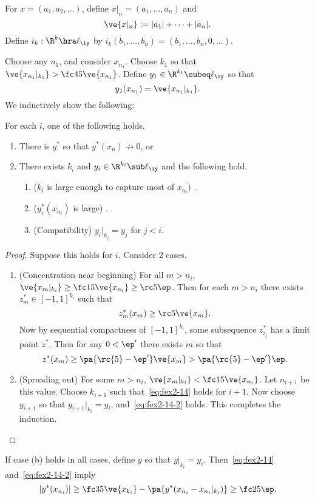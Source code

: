 \begin{enumerate}
For $x=(a_1,a_2,\ldots)$, define $x|_n=(a_1,\ldots, a_n)$ and
\[
\ve{x|_n}:=|a_1|+\cdots +|a_n|.
\]
Define $i_k:\R^k\hra \ell_{\iy}$ by $i_k(b_1,\ldots, b_n)=(b_1,\ldots, b_n,0,\ldots)$.

Choose any $n_1$, and consider $x_{n_1}$. Choose $k_1$ so that 
$\ve{x_{n_1}|_{k_1}}>\fc 45\ve{x_{n_1}}$. Define $y_1\in \R^{k_1}\subeq \ell_{\iy}$ so that 
\[
y_1(x_{n_1})=\ve{x_{n_1}|_{k_1}}.
\]
We inductively show the following: 
\begin{clm*}
For each $i$, one of the following holds.
\begin{enumerate}
\item
There is $y^*$ so that $y^*(x_n)\not \to 0$, or 
\item
There exists $k_i$ and $y_i\in \R^{k_i}\sub \ell_{\iy}$ and  the following hold.
\begin{enumerate}
\item
($k_i$ is large enough to capture most of $x_{n_i}$) 
\ge {}.
\eeq
\item
($y_i^*(x_{n_i})$ is large)
\ge {}\ge {} \ep.
\eeq
\item (Compatibility) $y_i|_{k_j}=y_j$ for $j<i$.
\end{enumerate}
\end{enumerate}
\end{clm*}
\begin{proof}
Suppose this holds for $i$. Consider 2 cases.
\begin{enumerate}
\item
(Concentration near beginning)
For all $m>n_i$, $\ve{x_m|_{k_i}}\ge \fc 15\ve{x_{n_i}}\ge\rc5 \ep$. Then for each $m>n_i$ there exists $z_m^*\in [-1,1]^{k_i}$ such that
\[
z_m^*(x_m)\ge\rc5\ve{x_{m}}.
\]
Now by sequential compactness of $[-1,1]^{k_i}$, some subsequence $z_{i_j}^*$ has a limit point $z^*$. Then for any $0<\ep'$ there exists $m$ so that
\[
z^*(x_m)\ge \pa{\rc{5}-\ep'}\ve{x_{m}}>\pa{\rc{5}-\ep'}\ep.
\]
\item
(Spreading out)
For some $m>n_i$, $\ve{x_m|_{k_i}}< \fc 15\ve{x_{n_i}}$. Let $n_{i+1}$ be this value. Choose $k_{i+1}$ such that~\eqref{eq:fex2-14} holds for $i+1$. Now choose $y_{i+1}$ so that $y_{i+1}|_{k_i}=y_i$, and~\eqref{eq:fex2-14-2} holds. This completes the induction.
\end{enumerate}
\end{proof}
If case (b) holds in all cases, define $y$ so that $y|_{k_i}=y_i$. Then~\eqref{eq:fex2-14} and~\eqref{eq:fex2-14-2} imply 
\[
|y^*(x_{n_i})|\ge \fc35\ve{x_{k_i}}-\pa{y^*(x_{n_i}-x_{n_i}|_{k_i})}\ge\fc25\ep.
\]


\end{enumerate}
